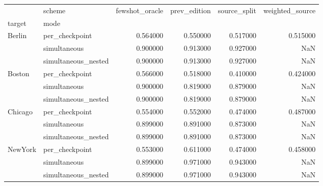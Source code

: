 \begin{tabular}{llrrrr}
\toprule
 & scheme & fewshot\_oracle & prev\_edition & source\_split & weighted\_source \\
target & mode &  &  &  &  \\
\midrule
\multirow[t]{3}{*}{Berlin} & per\_checkpoint & 0.564000 & 0.550000 & 0.517000 & 0.515000 \\
 & simultaneous & 0.900000 & 0.913000 & 0.927000 & NaN \\
 & simultaneous\_nested & 0.900000 & 0.913000 & 0.927000 & NaN \\
\cline{1-6}
\multirow[t]{3}{*}{Boston} & per\_checkpoint & 0.566000 & 0.518000 & 0.410000 & 0.424000 \\
 & simultaneous & 0.900000 & 0.819000 & 0.879000 & NaN \\
 & simultaneous\_nested & 0.900000 & 0.819000 & 0.879000 & NaN \\
\cline{1-6}
\multirow[t]{3}{*}{Chicago} & per\_checkpoint & 0.554000 & 0.552000 & 0.474000 & 0.487000 \\
 & simultaneous & 0.899000 & 0.891000 & 0.873000 & NaN \\
 & simultaneous\_nested & 0.899000 & 0.891000 & 0.873000 & NaN \\
\cline{1-6}
\multirow[t]{3}{*}{NewYork} & per\_checkpoint & 0.553000 & 0.611000 & 0.474000 & 0.458000 \\
 & simultaneous & 0.899000 & 0.971000 & 0.943000 & NaN \\
 & simultaneous\_nested & 0.899000 & 0.971000 & 0.943000 & NaN \\
\cline{1-6}
\bottomrule
\end{tabular}
